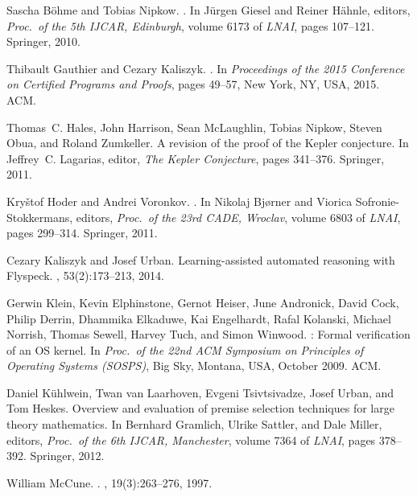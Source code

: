\documentclass{article}
\begin{document}
%

\begin{thebibliography}{10}

Sascha B{\"o}hme and Tobias Nipkow.
.
\newblock In J{\"u}rgen Giesel and Reiner H{\"a}hnle, editors, {\em Proc.\ of
  the 5th IJCAR, Edinburgh}, volume 6173 of {\em LNAI}, pages 107--121.
  Springer, 2010.

Thibault Gauthier and Cezary Kaliszyk.
.
\newblock In {\em Proceedings of the 2015 Conference on Certified Programs and
  Proofs}, pages 49--57, New York, NY, USA, 2015. ACM.

Thomas~C. Hales, John Harrison, Sean McLaughlin, Tobias Nipkow, Steven Obua,
  and Roland Zumkeller.
\newblock A revision of the proof of the {K}epler conjecture.
\newblock In Jeffrey~C. Lagarias, editor, {\em The {K}epler Conjecture}, pages
  341--376. Springer, 2011.

Kry\v{s}tof Hoder and Andrei Voronkov.
.
\newblock In Nikolaj Bj{\o}rner and Viorica Sofronie-Stokkermans, editors, {\em
  Proc.\ of the 23rd CADE, Wroclav}, volume 6803 of {\em LNAI}, pages 299--314.
  Springer, 2011.

Cezary Kaliszyk and Josef Urban.
\newblock Learning-assisted automated reasoning with {Flyspeck}.
, 53(2):173--213, 2014.

Gerwin Klein, Kevin Elphinstone, Gernot Heiser, June Andronick, David Cock,
  Philip Derrin, Dhammika Elkaduwe, Kai Engelhardt, Rafal Kolanski, Michael
  Norrish, Thomas Sewell, Harvey Tuch, and Simon Winwood.
: Formal verification of an {OS} kernel.
\newblock In {\em Proc.\ of the 22nd ACM Symposium on Principles of Operating
  Systems (SOSPS)}, Big Sky, Montana, USA, October 2009. ACM.

Daniel K{\"u}hlwein, Twan van Laarhoven, Evgeni Tsivtsivadze, Josef Urban, and
  Tom Heskes.
\newblock Overview and evaluation of premise selection techniques for large
  theory mathematics.
\newblock In Bernhard Gramlich, Ulrike Sattler, and Dale Miller, editors, {\em
  Proc.\ of the 6th IJCAR, Manchester}, volume 7364 of {\em LNAI}, pages
  378--392. Springer, 2012.

William McCune.
.
, 19(3):263--276, 1997.


\end{thebibliography}
\end{document}

